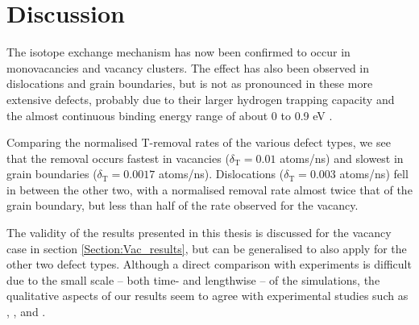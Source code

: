 \section{Discussion}
The isotope exchange mechanism has now been confirmed to occur in monovacancies and vacancy clusters. 
The effect has also been observed in dislocations and grain boundaries, but is not as pronounced in these more extensive defects, probably due to their larger hydrogen trapping capacity and the almost continuous binding energy range of about 0 to 0.9 eV \cite{grigorev2015interaction}.

Comparing the normalised T-removal rates of the various defect types, we see that the removal occurs fastest in vacancies ($\delta_{\text{T}} = 0.01$ atoms/ns) and slowest in grain boundaries ($\delta_{\text{T}} = 0.0017$ atoms/ns). 
Dislocations ($\delta_{\text{T}} = 0.003$ atoms/ns) fell in between the other two, with a normalised removal rate almost twice that of the grain boundary, but less than half of the rate observed for the vacancy.

The validity of the results presented in this thesis is discussed for the vacancy case in section \ref{Section:Vac_results}, but can be generalised to also apply for the other two defect types. 
Although a direct comparison with experiments is difficult due to the small scale -- both time- and lengthwise -- of the simulations, the qualitative aspects of our results seem to agree with experimental studies such as \cite{alimov2011hydrogen}, \cite{roth2013hydrogen}, \cite{barton2014deuterium} and \cite{ahlgren2019hydrogen}. 
